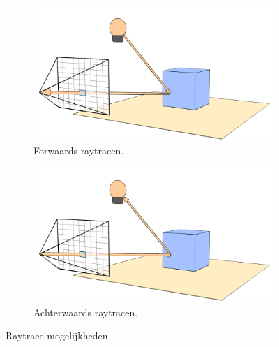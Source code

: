 \begin{figure}
  \centering
  \begin{subfigure}[b]{0.45\textwidth}
    \includegraphics[width=\textwidth]{./img/raw/rt-forward/forward.png}
    \caption{Forwaards raytracen.}
    \label{fig:rt-forward:forward}
  \end{subfigure}\quad%
  \begin{subfigure}[b]{0.45\textwidth}
    \includegraphics[width=\textwidth]{./img/raw/rt-forward/backward.png}
    \caption{Achterwaards raytracen.}
    \label{fig:rt-forward:backward}
  \end{subfigure}%
  \caption{Raytrace mogelijkheden}
  \label{fig:rt-forward}
\end{figure}
